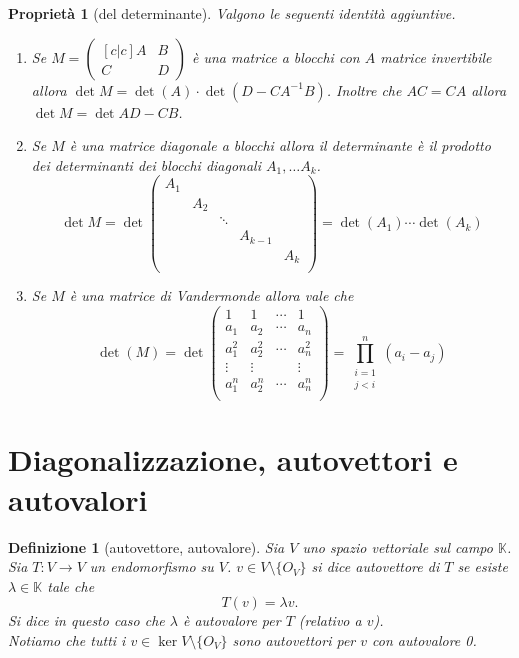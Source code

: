 \documentclass[9pt, a4paper]{article}
\newcommand{\K}{\mathbb{K}}
\newcommand{\letvs}{Sia $ V $ uno spazio vettoriale sul campo $ \K $}
\theoremstyle{mythm}
\newtheorem{definition}{Definizione}[section]
\newtheorem{propriety}{Proprietà}[section]
\begin{document}
\begin{propriety}[del determinante]
	Valgono le seguenti identità aggiuntive. 
	\begin{enumerate}
		\item Se $ M = \begin{pmatrix}[c|c]
		A & B \\ \hline
		C & D
		\end{pmatrix} $	
		è una matrice a blocchi con $ A $ matrice invertibile allora $ \det{M} = \det{(A)} \cdot \det{(D - CA^{-1}B)} $. Inoltre che $ AC = CA $ allora $ \det{M} = \det{AD - CB} $. 
		\item Se $ M $ è una matrice diagonale a blocchi allora il determinante è il prodotto dei determinanti dei blocchi diagonali $ A_1, \ldots A_k $. 
		\[\det{M} = \det
		\begin{pmatrix}
		A_1		&		&		&		&		 \\
				& A_2	&		&		&		 \\
				& 		&\ddots &		&		 \\	 
				& 		&		& A_{k - 1}		&		 \\	
				& 		& &		& A_{k}		 \\	 		 		
		\end{pmatrix}
		= \det{(A_1)} \cdots \det{(A_k)}\]
		\item Se $ M $ è una \emph{matrice di Vandermonde} allora vale che 
		\[\det{(M)} = \det 
		\begin{pmatrix}
			1 & 1 & \cdots & 1 \\
			a_1 & a_2 & \cdots & a_n \\
			a_1^{2} & a_2^{2} & \cdots & a_n^{2} \\
			\vdots & \vdots & & \vdots \\
			a_1^{n} & a_2^{n} & \cdots & a_n^{n} \\
		\end{pmatrix} 
		= \prod_{\substack{i = 1 \\ j < i}}^{n} (a_i - a_j)\]
	\end{enumerate}
\end{propriety}

\clearpage

\section{Diagonalizzazione, autovettori e autovalori}

\begin{definition}[autovettore, autovalore]
	\letvs. Sia $ T \colon V \to V $ un endomorfismo su $ V $. $ v \in V \setminus \{O_V\} $ si dice autovettore di $ T $ se esiste $ \lambda \in \K $ tale che \[T(v) = \lambda v.\] Si dice in questo caso che $ \lambda $ è autovalore per $ T $ (relativo a $ v $). \\
	Notiamo che tutti i $ v \in \ker V \setminus \{O_V\} $ sono autovettori per $ v $ con autovalore 0.  
\end{definition}
\end{document}
